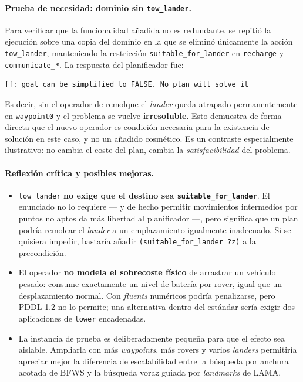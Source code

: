 \documentclass[12pt,a4paper]{article}
\begin{document}
\paragraph{Prueba de necesidad: dominio sin \texttt{tow\_lander}.}
Para verificar que la funcionalidad a\~nadida no es redundante, se repiti\'o la
ejecuci\'on sobre una copia del dominio en la que se elimin\'o \'unicamente la
acci\'on \texttt{tow\_lander}, manteniendo la restricci\'on
\texttt{suitable\_for\_lander} en \texttt{recharge} y \texttt{communicate\_*}.
La respuesta del planificador fue:

\begin{lstlisting}[language={}]
ff: goal can be simplified to FALSE. No plan will solve it
\end{lstlisting}

Es decir, sin el operador de remolque el \emph{lander} queda atrapado
permanentemente en \texttt{waypoint0} y el problema se vuelve
\textbf{irresoluble}. Esto demuestra de forma directa que el nuevo operador es
condici\'on necesaria para la existencia de soluci\'on en este caso, y no un
a\~nadido cosm\'etico. Es un contraste especialmente ilustrativo: no cambia el
coste del plan, cambia la \emph{satisfacibilidad} del problema.

\paragraph{Reflexi\'on cr\'itica y posibles mejoras.}
\begin{itemize}[leftmargin=*]
\item \texttt{tow\_lander} \textbf{no exige que el destino sea
\texttt{suitable\_for\_lander}}. El enunciado no lo requiere --- y de hecho
permitir movimientos intermedios por puntos no aptos da m\'as libertad al
planificador ---, pero significa que un plan podr\'ia remolcar el
\emph{lander} a un emplazamiento igualmente inadecuado. Si se quisiera
impedir, bastar\'ia a\~nadir \texttt{(suitable\_for\_lander ?z)} a la
precondici\'on.
\item El operador \textbf{no modela el sobrecoste f\'isico} de arrastrar un
veh\'iculo pesado: consume exactamente un nivel de bater\'ia por rover, igual
que un desplazamiento normal. Con \emph{fluents} num\'ericos podr\'ia
penalizarse, pero PDDL 1.2 no lo permite; una alternativa dentro del est\'andar
ser\'ia exigir dos aplicaciones de \texttt{lower} encadenadas.
\item La instancia de prueba es deliberadamente peque\~na para que el efecto
sea aislable. Ampliarla con m\'as \emph{waypoints}, m\'as rovers y varios
\emph{landers} permitir\'ia apreciar mejor la diferencia de escalabilidad
entre la b\'usqueda por anchura acotada de BFWS y la b\'usqueda voraz guiada
por \emph{landmarks} de LAMA.
\end{itemize}
\end{document}
